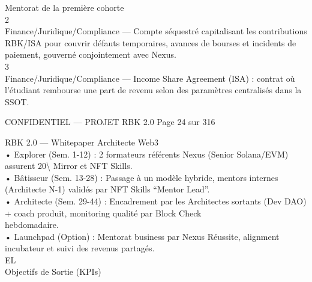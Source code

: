 \documentclass[12pt,landscape,a4paper]{article}
\newenvironment{confidential}
{\begin{tcolorbox}[
    colback=rbkred!5!white,
    colframe=rbkred!75!black,
    title=CONFIDENTIEL,
    fonttitle=\bfseries\color{white},
    coltitle=rbkred!75!black,
    breakable,
    enhanced,
    frame hidden,
    borderline west={2pt}{0pt}{rbkred!75!black}
]}
{\end{tcolorbox}}
\begin{document}
Mentorat de la première cohorte\\
2\\
Finance/Juridique/Compliance — Compte séquestré capitalisant les contributions RBK/ISA pour couvrir défauts temporaires, avances de bourses et incidents de\\
paiement, gouverné conjointement avec Nexus.\\
3\\
Finance/Juridique/Compliance — Income Share Agreement (ISA) : contrat où l’étudiant rembourse une part de revenu selon des paramètres centralisés dans la\\
SSOT.\\
\vspace{0.5em}
\vspace{0.5em}
\vspace{0.5em}
\begin{confidential}CONFIDENTIEL — PROJET RBK 2.0                                          Page 24 sur 316\end{confidential}
RBK 2.0 — Whitepaper Architecte Web3\\
\vspace{0.5em}
\vspace{0.5em}
\vspace{0.5em}
• Explorer (Sem. 1-12) : 2 formateurs référents Nexus (Senior Solana/EVM) assurent 20\textbackslash{}%
Mirror et NFT Skills.\\
\vspace{0.5em}
• Bâtisseur (Sem. 13-28) : Passage à un modèle hybride, mentors internes (Architecte N-1) validés par NFT Skills “Mentor Lead”.\\
\vspace{0.5em}
• Architecte (Sem. 29-44) : Encadrement par les Architectes sortants (Dev DAO) + coach produit, monitoring qualité par Block Check\\
hebdomadaire.\\
\vspace{0.5em}
• Launchpad (Option) : Mentorat business par Nexus Réussite, alignment incubateur et suivi des revenus partagés.\\
\vspace{0.5em}
\vspace{0.5em}
\vspace{0.5em}
\vspace{0.5em}
EL\\
Objectifs de Sortie (KPIs)\\
\end{document}
